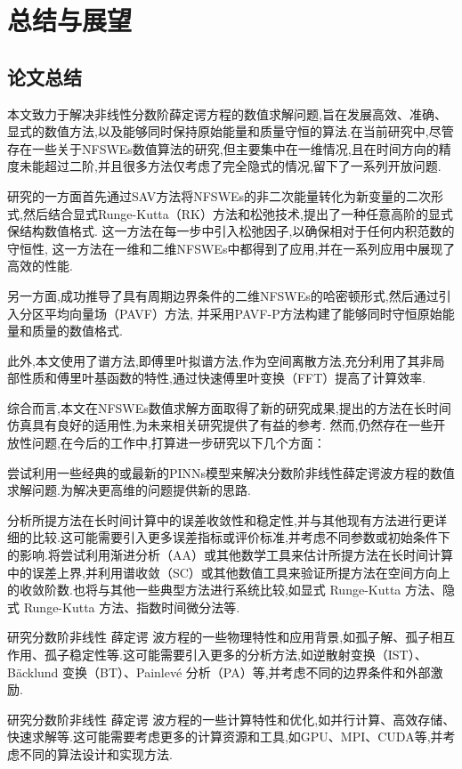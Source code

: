 
\chapter[总结与展望]{总结与展望}
\section{论文总结}

本文致力于解决非线性分数阶薛定谔方程的数值求解问题,旨在发展高效、准确、显式的数值方法,以及能够同时保持原始能量和质量守恒的算法.在当前研究中,尽管存在一些关于NFSWEs数值算法的研究,但主要集中在一维情况,且在时间方向的精度未能超过二阶,并且很多方法仅考虑了完全隐式的情况,留下了一系列开放问题.

研究的一方面首先通过SAV方法将NFSWEs的非二次能量转化为新变量的二次形式,然后结合显式Runge-Kutta（RK）方法和松弛技术,提出了一种任意高阶的显式保结构数值格式.
这一方法在每一步中引入松弛因子,以确保相对于任何内积范数的守恒性,
这一方法在一维和二维NFSWEs中都得到了应用,并在一系列应用中展现了高效的性能.

另一方面,成功推导了具有周期边界条件的二维NFSWEs的哈密顿形式,然后通过引入分区平均向量场（PAVF）方法,
并采用PAVF-P方法构建了能够同时守恒原始能量和质量的数值格式.

此外,本文使用了谱方法,即傅里叶拟谱方法,作为空间离散方法,充分利用了其非局部性质和傅里叶基函数的特性,通过快速傅里叶变换（FFT）提高了计算效率.

综合而言,本文在NFSWEs数值求解方面取得了新的研究成果,提出的方法在长时间仿真具有良好的适用性,为未来相关研究提供了有益的参考.
然而,仍然存在一些开放性问题,在今后的工作中,打算进一步研究以下几个方面：

尝试利用一些经典的或最新的PINNs模型来解决分数阶非线性薛定谔波方程的数值求解问题.为解决更高维的问题提供新的思路.

分析所提方法在长时间计算中的误差收敛性和稳定性,并与其他现有方法进行更详细的比较.这可能需要引入更多误差指标或评价标准,并考虑不同参数或初始条件下的影响.将尝试利用渐进分析（AA）或其他数学工具来估计所提方法在长时间计算中的误差上界,并利用谱收敛（SC）或其他数值工具来验证所提方法在空间方向上的收敛阶数.也将与其他一些典型方法进行系统比较,如显式 Runge-Kutta 方法、隐式 Runge-Kutta 方法、指数时间微分法等.

研究分数阶非线性 薛定谔 波方程的一些物理特性和应用背景,如孤子解、孤子相互作用、孤子稳定性等.这可能需要引入更多的分析方法,如逆散射变换（IST）、Bäcklund 变换（BT）、Painlevé 分析（PA）等,并考虑不同的边界条件和外部激励.

研究分数阶非线性 薛定谔 波方程的一些计算特性和优化,如并行计算、高效存储、快速求解等.这可能需要考虑更多的计算资源和工具,如GPU、MPI、CUDA等,并考虑不同的算法设计和实现方法.